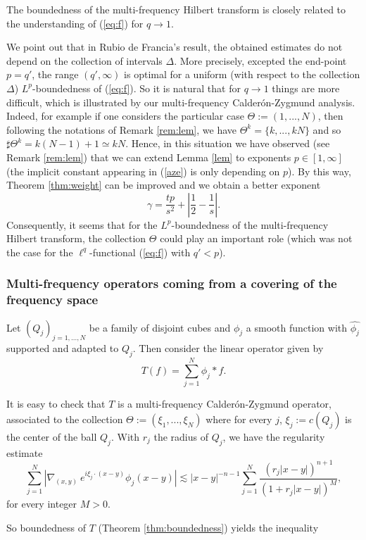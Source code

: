 \documentclass[11pt]{amsart}
\theoremstyle{remark}
\newcommand{\mb}{\medskip\noindent}
\begin{document}
The boundedness of the multi-frequency Hilbert transform is closely related to the understanding of (\ref{eq:f}) for $q\to 1$.

\mb

We point out that in Rubio de Francia's result, the obtained estimates do not depend on the collection of intervals $\Delta$. More precisely, excepted the end-point $p=q'$, the range $(q',\infty)$ is optimal for a uniform (with respect to the collection $\Delta$) $L^p$-boundedness of (\ref{eq:f}). So it is natural that for $q\to 1$ things are more difficult, which is illustrated by our multi-frequency Calder\'on-Zygmund analysis. Indeed, for example if one considers the particular case $\Theta:=(1,...,N)$, then following the notations of Remark \ref{rem:lem}, we have $\Theta^k =\{k,...,kN\}$ and so $\sharp \Theta^k = k(N-1)+1 \simeq k N$. Hence, in this situation we have observed (see Remark \ref{rem:lem}) that we can extend Lemma \ref{lem} to exponents $p\in[1,\infty]$ (the implicit constant appearing in (\ref{aze}) is only depending on $p$). By this way, Theorem \ref{thm:weight} can be improved and we obtain a better exponent
$$ \gamma=\frac{tp}{s^2}+\left|\frac{1}{2}-\frac{1}{s}\right|.$$
Consequently, it seems that for the $L^p$-boundedness of the multi-frequency Hilbert transform, the collection $\Theta$ could play an important role (which was not the case for the $\ell^q$-functional (\ref{eq:f}) with $q'<p$).



\subsubsection*{Multi-frequency operators coming from a covering of the frequency space}

Let $(Q_j)_{j=1,...,N}$ be a family of disjoint cubes and $\phi_j$ a smooth function with $\widehat{\phi_j}$ supported and adapted to $Q_j$. Then consider the linear operator given by
$$ T(f) = \sum_{j=1}^N \phi_j \ast f.$$

It is easy to check that $T$ is a multi-frequency Calder\'on-Zygmund operator, associated to the collection $\Theta:=(\xi_1,...,\xi_N)$ where for every $j$, $\xi_j:=c(Q_j)$ is the center of the ball $Q_j$. With $r_j$ the radius of $Q_j$, we have the regularity estimate
$$ \sum_{j=1}^N \left|\nabla_{(x,y)}\ e^{i\xi_j\cdot(x-y)} \phi_j(x-y)\right| \lesssim |x-y|^{-n-1} \sum_{j=1}^N \frac{(r_j |x-y|)^{n+1}}{(1+r_j|x-y|)^{M}},$$
for every integer $M>0$.

So boundedness of $T$ (Theorem \ref{thm:boundedness}) yields the inequality
\end{document}
